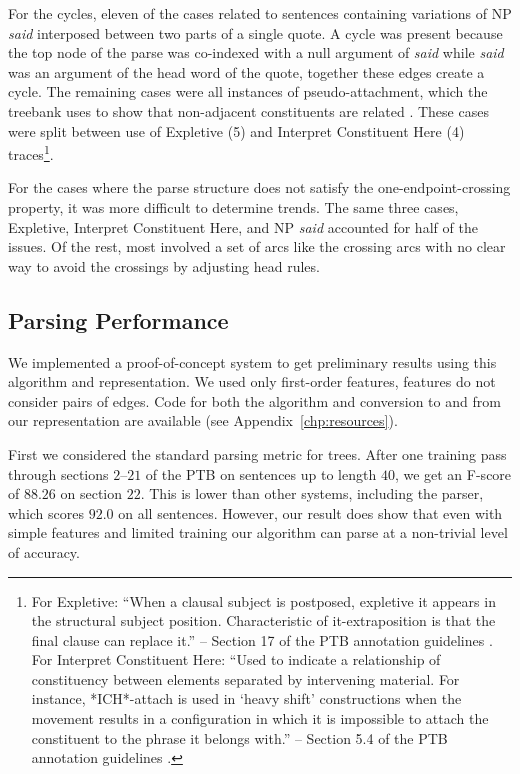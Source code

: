 For the cycles, eleven of the cases related to sentences containing variations of NP \emph{said} interposed between two parts of a single quote.
A cycle was present because the top node of the parse was co-indexed with a null argument of \emph{said} while \emph{said} was an argument of the head word of the quote, together these edges create a cycle.
The remaining cases were all instances of pseudo-attachment, which the treebank uses to show that non-adjacent constituents are related \parencite{ptb-guide}.
These cases were split between use of Expletive (5) and Interpret Constituent Here (4) traces\footnote{
For Expletive: ``When a clausal subject is postposed, expletive it appears in the structural subject position.
Characteristic of it-extraposition is that the final clause can replace it.'' -- Section 17 of the PTB annotation guidelines \parencite{ptb-guide}. \\
For Interpret Constituent Here: ``Used to indicate a relationship of constituency between elements separated by intervening material.
For instance, *ICH*-attach is used in `heavy shift' constructions when the movement results in a configuration in which it is impossible to attach the constituent to the phrase it belongs with.'' -- Section 5.4 of the PTB annotation guidelines \parencite{ptb-guide}.
}.

For the cases where the parse structure does not satisfy the one-endpoint-crossing property, it was more difficult to determine trends.
The same three cases, Expletive, Interpret Constituent Here, and NP \emph{said} accounted for half of the issues.
Of the rest, most involved a set of arcs like the crossing arcs with no clear way to avoid the crossings by adjusting head rules.

\subsection{Parsing Performance}

We implemented a proof-of-concept system to get preliminary results using this algorithm and representation.
We used only first-order features, \myie features do not consider pairs of edges.
Code for both the algorithm and conversion to and from our representation are available (see Appendix~\ref{chp:resources}).

First we considered the standard parsing metric for trees.
After one training pass through sections $2$--$21$ of the PTB on sentences up to length $40$, we get an F-score of $88.26$ on section $22$.
This is lower than other systems, including the \textcite{cck} parser, which scores $92.0$ on all sentences.
However, our result does show that even with simple features and limited training our algorithm can parse at a non-trivial level of accuracy.

